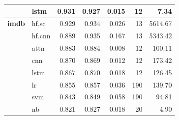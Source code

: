 \documentclass[final]{clv2025-revised}
\begin{document}
\begin{table}[h!]
{\begin{tabular}{@{}p{2cm}p{1.2cm}rrrrr@{}}
 & lstm & 0.931 & 0.927 & 0.015 & 12 & 7.34 \\
\midrule
\textbf{imdb} & hf.sc & 0.929 & 0.934 & 0.026 & 13 & 5614.67 \\
 & hf.cnn & 0.889 & 0.935 & 0.167 & 13 & 5343.42 \\
 & attn & 0.883 & 0.884 & 0.008 & 12 & 100.11 \\
 & cnn & 0.870 & 0.869 & 0.012 & 12 & 173.42 \\
 & lstm & 0.867 & 0.870 & 0.018 & 12 & 126.45 \\
 & lr & 0.855 & 0.857 & 0.036 & 190 & 139.70 \\
 & svm & 0.843 & 0.849 & 0.058 & 190 & 94.81 \\
 & nb & 0.821 & 0.827 & 0.018 & 20 & 4.90 \\
\bottomrule
\end{tabular}%
}
\end{table}
\end{document}

